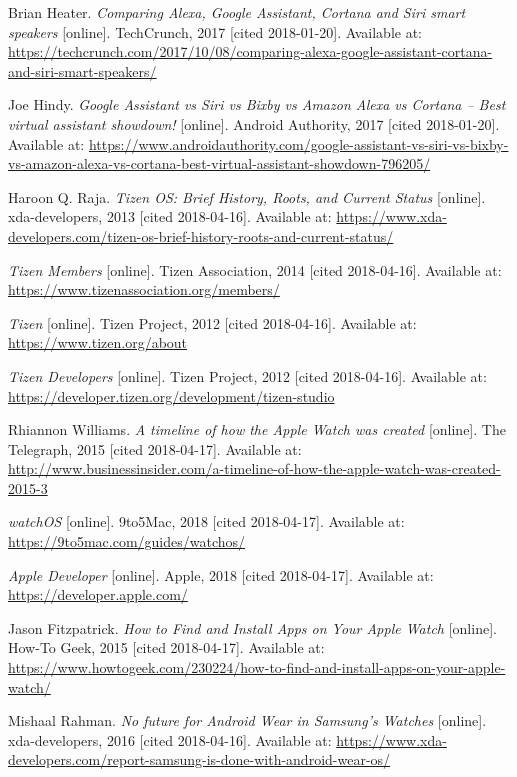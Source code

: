 \begin{thebibliography}{10}
Brian Heater. \textit{Comparing Alexa, Google Assistant, Cortana and Siri smart speakers} [online]. TechCrunch, 2017 [cited 2018-01-20]. Available at: \url{https://techcrunch.com/2017/10/08/comparing-alexa-google-assistant-cortana-and-siri-smart-speakers/}

Joe Hindy. \textit{Google Assistant vs Siri vs Bixby vs Amazon Alexa vs Cortana – Best virtual assistant showdown!} [online]. Android Authority, 2017 [cited 2018-01-20]. Available at: \url{https://www.androidauthority.com/google-assistant-vs-siri-vs-bixby-vs-amazon-alexa-vs-cortana-best-virtual-assistant-showdown-796205/}

Haroon Q. Raja. \textit{Tizen OS: Brief History, Roots, and Current Status} [online]. xda-developers, 2013 [cited 2018-04-16]. Available at: \url{https://www.xda-developers.com/tizen-os-brief-history-roots-and-current-status/}

\textit{Tizen Members} [online]. Tizen Association, 2014 [cited 2018-04-16]. Available at: \url{https://www.tizenassociation.org/members/}

\textit{Tizen} [online]. Tizen Project, 2012 [cited 2018-04-16]. Available at: \url{https://www.tizen.org/about}

\textit{Tizen Developers} [online]. Tizen Project, 2012 [cited 2018-04-16]. Available at: \url{https://developer.tizen.org/development/tizen-studio}

Rhiannon Williams. \textit{A timeline of how the Apple Watch was created} [online]. The Telegraph, 2015 [cited 2018-04-17]. Available at: \url{http://www.businessinsider.com/a-timeline-of-how-the-apple-watch-was-created-2015-3}

\textit{watchOS} [online]. 9to5Mac, 2018 [cited 2018-04-17]. Available at: \url{https://9to5mac.com/guides/watchos/}

\textit{Apple Developer} [online]. Apple, 2018 [cited 2018-04-17]. Available at: \url{https://developer.apple.com/}

Jason Fitzpatrick. \textit{How to Find and Install Apps on Your Apple Watch} [online]. How-To Geek, 2015 [cited 2018-04-17]. Available at: \url{https://www.howtogeek.com/230224/how-to-find-and-install-apps-on-your-apple-watch/}

Mishaal Rahman. \textit{No future for Android Wear in Samsung’s Watches} [online]. xda-developers, 2016 [cited 2018-04-16]. Available at: \url{https://www.xda-developers.com/report-samsung-is-done-with-android-wear-os/}


\end{thebibliography}
